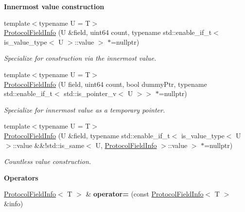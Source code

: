\begin{Indent}\textbf{ Innermost value construction}\par
\begin{DoxyCompactItemize}
\item 
{\footnotesize template$<$typename U  = T$>$ }\\\mbox{\hyperlink{structrev_1_1_protocol_field_info_aca2badda599387af7b120d02573f6b12}{Protocol\+Field\+Info}} (U \&field, uint64 count, typename std\+::enable\+\_\+if\+\_\+t$<$ is\+\_\+value\+\_\+type$<$ U $>$\+::value $>$ $\ast$=nullptr)
\begin{DoxyCompactList}\small\item\em Specialize for construction via the innermost value. \end{DoxyCompactList}\item 
{\footnotesize template$<$typename U  = T$>$ }\\\mbox{\hyperlink{structrev_1_1_protocol_field_info_ab793db9a16106b0f9dda3897d2205035}{Protocol\+Field\+Info}} (U field, uint64 count, bool dummy\+Ptr, typename std\+::enable\+\_\+if\+\_\+t$<$ std\+::is\+\_\+pointer\+\_\+v$<$ U $>$$>$ $\ast$=nullptr)
\begin{DoxyCompactList}\small\item\em Specialize for innermost value as a temporary pointer. \end{DoxyCompactList}\item 
{\footnotesize template$<$typename U  = T$>$ }\\\mbox{\hyperlink{structrev_1_1_protocol_field_info_a62761a3ce30a3596139c1bcffdc8d3c5}{Protocol\+Field\+Info}} (U \&field, typename std\+::enable\+\_\+if\+\_\+t$<$ is\+\_\+value\+\_\+type$<$ U $>$\+::value \&\&!std\+::is\+\_\+same$<$ U, \mbox{\hyperlink{structrev_1_1_protocol_field_info}{Protocol\+Field\+Info}} $>$\+::value $>$ $\ast$=nullptr)
\begin{DoxyCompactList}\small\item\em Countless value construction. \end{DoxyCompactList}\end{DoxyCompactItemize}
\end{Indent}
\begin{Indent}\textbf{ Operators}\par
\begin{DoxyCompactItemize}
\item 
\mbox{\label{structrev_1_1_protocol_field_info_a5ee8477d76b8f28c5b0c6745b4ea1369}} 
\mbox{\hyperlink{structrev_1_1_protocol_field_info}{Protocol\+Field\+Info}}$<$ T $>$ \& {\bfseries operator=} (const \mbox{\hyperlink{structrev_1_1_protocol_field_info}{Protocol\+Field\+Info}}$<$ T $>$ \&info)
\end{DoxyCompactItemize}
\end{Indent}
